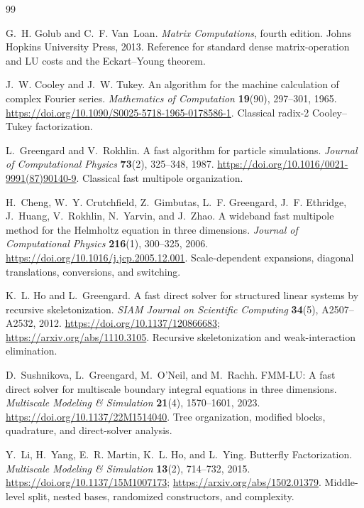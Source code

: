 \documentclass[11pt,a4paper]{article}
\begin{document}
\begin{thebibliography}{99}\footnotesize\raggedright

G.~H. Golub and C.~F. Van~Loan.
\emph{Matrix Computations}, fourth edition.
Johns Hopkins University Press, 2013.
Reference for standard dense matrix-operation and LU costs and the Eckart--Young theorem.

J.~W. Cooley and J.~W. Tukey.
An algorithm for the machine calculation of complex Fourier series.
\emph{Mathematics of Computation} \textbf{19}(90), 297--301, 1965.
\url{https://doi.org/10.1090/S0025-5718-1965-0178586-1}.
Classical radix-2 Cooley--Tukey factorization.

L.~Greengard and V.~Rokhlin.
A fast algorithm for particle simulations.
\emph{Journal of Computational Physics} \textbf{73}(2), 325--348, 1987.
\url{https://doi.org/10.1016/0021-9991(87)90140-9}.
Classical fast multipole organization.

H.~Cheng, W.~Y. Crutchfield, Z.~Gimbutas, L.~F. Greengard,
J.~F. Ethridge, J.~Huang, V.~Rokhlin, N.~Yarvin, and J.~Zhao.
A wideband fast multipole method for the Helmholtz equation in three dimensions.
\emph{Journal of Computational Physics} \textbf{216}(1), 300--325, 2006.
\url{https://doi.org/10.1016/j.jcp.2005.12.001}.
Scale-dependent expansions, diagonal translations, conversions, and switching.

K.~L. Ho and L.~Greengard.
A fast direct solver for structured linear systems by recursive skeletonization.
\emph{SIAM Journal on Scientific Computing} \textbf{34}(5), A2507--A2532, 2012.
\url{https://doi.org/10.1137/120866683}; \url{https://arxiv.org/abs/1110.3105}.
Recursive skeletonization and weak-interaction elimination.

D.~Sushnikova, L.~Greengard, M.~O'Neil, and M.~Rachh.
FMM-LU: A fast direct solver for multiscale boundary integral equations in three dimensions.
\emph{Multiscale Modeling \& Simulation} \textbf{21}(4), 1570--1601, 2023.
\url{https://doi.org/10.1137/22M1514040}.
Tree organization, modified blocks, quadrature, and direct-solver analysis.

Y.~Li, H.~Yang, E.~R. Martin, K.~L. Ho, and L.~Ying.
Butterfly Factorization.
\emph{Multiscale Modeling \& Simulation} \textbf{13}(2), 714--732, 2015.
\url{https://doi.org/10.1137/15M1007173}; \url{https://arxiv.org/abs/1502.01379}.
Middle-level split, nested bases, randomized constructors, and complexity.


\end{thebibliography}
\end{document}

